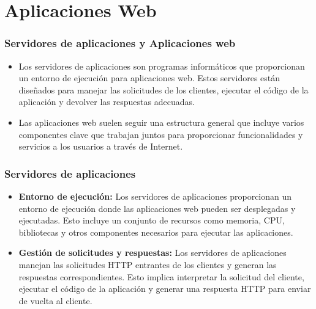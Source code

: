 %


\section{Aplicaciones Web}


\begin{frame}
	\frametitle{Servidores de aplicaciones y Aplicaciones web}	
	\begin{itemize}		
		\item Los servidores de aplicaciones son programas informáticos que proporcionan un entorno de ejecución para aplicaciones web. Estos servidores están diseñados para manejar las solicitudes de los clientes, ejecutar el código de la aplicación y devolver las respuestas adecuadas.
		\item Las aplicaciones web suelen seguir una estructura general que incluye varios componentes clave que trabajan juntos para proporcionar funcionalidades y servicios a los usuarios a través de Internet. 		
	\end{itemize}
\end{frame}


\begin{frame}
	\frametitle{Servidores de aplicaciones}
	
	\begin{itemize}
		\item \textbf{Entorno de ejecución:} Los servidores de aplicaciones proporcionan un entorno de ejecución donde las aplicaciones web pueden ser desplegadas y ejecutadas. Esto incluye un conjunto de recursos como memoria, CPU, bibliotecas y otros componentes necesarios para ejecutar las aplicaciones.				
		\item \textbf{Gestión de solicitudes y respuestas:} Los servidores de aplicaciones manejan las solicitudes HTTP entrantes de los clientes y generan las respuestas correspondientes. Esto implica interpretar la solicitud del cliente, ejecutar el código de la aplicación y generar una respuesta HTTP para enviar de vuelta al cliente.
		
	\end{itemize}	
\end{frame}

